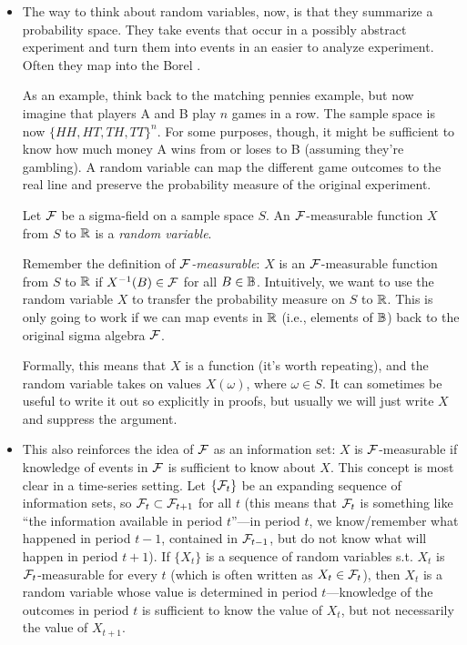 \begin{itemize}[leftmargin=0pt]
\item The way to think about random variables, now, is that they
  summarize a probability space.  They take events that occur in a
  possibly abstract experiment and turn them into events in an easier
  to analyze experiment.  Often they map into the Borel \sigmafield.

  As an example, think back to the matching pennies example, but now
  imagine that players A and B play $n$ games in a row.  The sample
  space is now $\{HH, HT, TH, TT\}^n$.  For some purposes, though, it
  might be sufficient to know how much money A wins from or loses to B
  (assuming they're gambling).  A random variable can map the
  different game outcomes to the real line and preserve the
  probability measure of the original experiment.

  \begin{defn} Let $\mathcal{F}$ be a sigma-field on a sample space $S$.  An
  $\mathcal{F}$-measurable function $X$ from $S$ to $\mathbb{R}$ is a \emph{random
  variable}.
  \end{defn}

  Remember the definition of \emph{$\mathcal{F}$-measurable}: $X$ is an
  $\mathcal{F}$-measurable function from $S$ to $\mathbb{R}$ if $X^{-1}(B) \in \mathcal{F}$ for
  all $B \in \mathbb{B}$.  Intuitively, we want to use the random variable $X$
  to transfer the probability measure on $S$ to $\mathbb{R}$.  This is only
  going to work if we can map events in $\mathbb{R}$ (i.e., elements of
  $\mathbb{B}$) back to the original sigma algebra $\mathcal{F}$.

  Formally, this means that $X$ is a function (it's worth repeating),
  and the random variable takes on values $X(\omega)$, where $\omega
  \in S$.  It can sometimes be useful to write it out so explicitly in
  proofs, but usually we will just write $X$ and suppress the
  argument.

\item This also reinforces the idea of $\mathcal{F}$ as an information set:
  $X$ is $\mathcal{F}$-measurable if knowledge of events in $\mathcal{F}$ is
  sufficient to know about $X$.  This concept is most clear in a
  time-series setting.  Let $\{\mathcal{F}_t\}$ be an expanding sequence of
  information sets, so $\mathcal{F}_t \subset \mathcal{F}_{t+1}$ for all $t$ (this means
  that $\mathcal{F}_t$ is something like ``the information available in period
  $t$''---in period $t$, we know/remember what happened in period $t-1$,
  contained in $\mathcal{F}_{t-1}$, but do not know what will happen in period
  $t+1$).  If $\{X_t\}$ is a sequence of random variables s.t. $X_t$ is
  $\mathcal{F}_t$-measurable for every $t$ (which is often written as $X_t \in
  \mathcal{F}_t$), then $X_t$ is a random variable whose value is determined
  in period $t$---knowledge of the outcomes in period $t$ is sufficient
  to know the value of $X_t$, but not necessarily the value of
  $X_{t+1}$.


\end{itemize}

